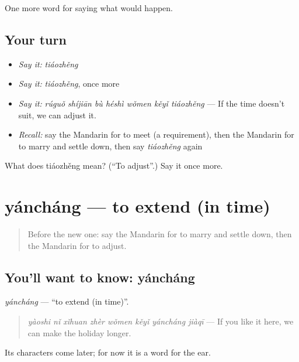 \begin{grammarlens}[title={What you've built}]
One more word for saying what would happen.
\end{grammarlens}

\subsection*{Your turn}
\begin{itemize}
\raggedright
  \item \emph{Say it:} \emph{tiáozhěng}
  \item \emph{Say it:} \emph{tiáozhěng}, once more
  \item \emph{Say it:} \emph{rúguǒ shíjiān bù héshì wǒmen kěyǐ tiáozhěng} — If the time doesn't suit, we can adjust it.
  \item \emph{Recall:} say the Mandarin for to meet (a requirement), then the Mandarin for to marry and settle down, then say \emph{tiáozhěng} again
\end{itemize}

\begin{tcolorbox}[breakable,colback=teal!4,colframe=teal!35!black,title={Before you move on}]
What does tiáozhěng mean? (\textquotedblleft{}To adjust\textquotedblright{}.) Say it once more.
\end{tcolorbox}
\section[yáncháng]{yáncháng — to extend (in time)}

\label{lesson:ZH-C400-yanchang}



\begin{quote}
Before the new one: say the Mandarin for to marry and settle down, then the Mandarin for to adjust.
\end{quote}

\subsection*{You'll want to know: yáncháng}
\emph{yáncháng} — \textquotedblleft{}to extend (in time)\textquotedblright{}.

\begin{quote}
\emph{yàoshi nǐ xǐhuan zhèr wǒmen kěyǐ yáncháng jiàqī} — If you like it here, we can make the holiday longer.
\end{quote}

Its characters come later; for now it is a word for the ear.

